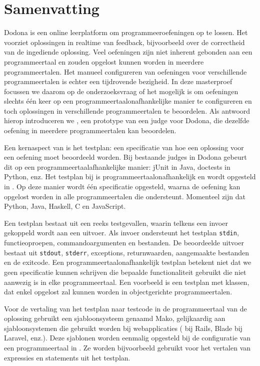 \chapter*{Samenvatting}

Dodona is een online leerplatform om programmeeroefeningen op te lossen.
Het voorziet oplossingen in realtime van feedback, bijvoorbeeld over de correctheid van de ingediende oplossing.
Veel oefeningen zijn niet inherent gebonden aan een programmeertaal en zouden opgelost kunnen worden in meerdere programmeertalen.
Het manueel configureren van oefeningen voor verschillende programmeertalen is echter een tijdrovende bezigheid.
In deze masterproef focussen we daarom op de onderzoeksvraag of het mogelijk is om oefeningen slechts één keer op een programmeertaalonafhankelijke manier te configureren en toch oplossingen in verschillende programmeertalen te beoordelen.
Als antwoord hierop introduceren we \tested{}, een prototype van een judge voor Dodona, die dezelfde oefening in meerdere programmeertalen kan beoordelen.

Een kernaspect van \tested{} is het testplan: een specificatie van hoe een oplossing voor een oefening moet beoordeeld worden.
Bij bestaande judges in Dodona gebeurt dit op een programmeertaalafhankelijke manier: jUnit in Java, doctests in Python, enz.
Het testplan bij \tested{} is programmeertaalonafhankelijk en wordt opgesteld in .
Op deze manier wordt één specificatie opgesteld, waarna de oefening kan opgelost worden in alle programmeertalen die \tested{} ondersteunt.
Momenteel zijn dat Python, Java, Haskell, C en JavaScript.

Een testplan bestaat uit een reeks testgevallen, waarin telkens een invoer gekoppeld wordt aan een uitvoer.
Als invoer ondersteunt het testplan \texttt{stdin}, functieoproepen, commandoargumenten en bestanden.
De beoordeelde uitvoer bestaat uit \texttt{stdout}, \texttt{stderr}, exceptions, returnwaarden, aangemaakte bestanden en de exitcode.
Een programmeertaalonafhankelijk testplan betekent niet dat we geen specificatie kunnen schrijven die bepaalde functionaliteit gebruikt die niet aanwezig is in elke programmeertaal.
Een voorbeeld is een testplan met klassen, dat enkel opgelost zal kunnen worden in objectgerichte programmeertalen.

Voor de vertaling van het testplan naar testcode in de programmeertaal van de oplossing gebruikt \tested{} een sjabloonsysteem genaamd Mako, gelijkaardig aan sjabloonsystemen die gebruikt worden bij webapplicaties ( bij Rails, Blade bij Laravel, enz.).
Deze sjablonen worden eenmalig opgesteld bij de configuratie van een programmeertaal in \tested{}.
Ze worden bijvoorbeeld gebruikt voor het vertalen van expressies en statements uit het testplan.

